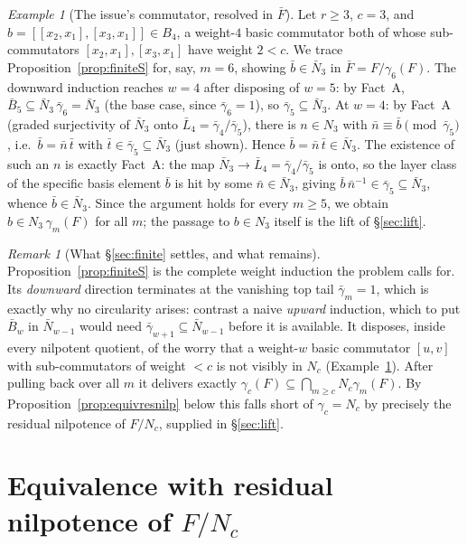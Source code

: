 \documentclass{amsart}
\theoremstyle{definition}
\theoremstyle{remark}
\newtheorem{remark}{Remark}
\newtheorem{example}{Example}
\begin{document}
\begin{example}[The issue's commutator, resolved in $\bar F$]\label{ex:worked}
Let $r\ge3$, $c=3$, and $b=[[x_2,x_1],[x_3,x_1]]\in B_4$, a weight-$4$ basic
commutator both of whose sub-commutators $[x_2,x_1],[x_3,x_1]$ have weight $2<c$. We
trace Proposition~\ref{prop:finiteS} for, say, $m=6$, showing $\bar b\in\bar N_3$ in
$\bar F=F/\gamma_6(F)$. The downward induction reaches $w=4$ after disposing of
$w=5$: by Fact~A, $\bar B_5\subseteq\bar N_3\,\bar\gamma_6=\bar N_3$ (the base case,
since $\bar\gamma_6=1$), so $\bar\gamma_5\subseteq\bar N_3$. At $w=4$: by Fact~A
(graded surjectivity of $\bar N_3$ onto $\bar L_4=\bar\gamma_4/\bar\gamma_5$), there
is $n\in N_3$ with $\bar n\equiv\bar b\pmod{\bar\gamma_5}$, i.e.\ $\bar b=\bar
n\,\bar t$ with $\bar t\in\bar\gamma_5\subseteq\bar N_3$ (just shown). Hence $\bar b=\bar n\,\bar t\in\bar N_3$. The existence of such an $n$
is exactly Fact~A: the map $\bar N_3\to\bar L_4=\bar\gamma_4/\bar\gamma_5$ is onto, so
the layer class of the specific basis element $\bar b$ is hit by some $\bar n\in\bar
N_3$, giving $\bar b\,\bar n^{-1}\in\bar\gamma_5\subseteq\bar N_3$, whence $\bar b\in
\bar N_3$. Since the argument holds for every $m\ge5$, we
obtain $b\in N_3\,\gamma_m(F)$ for all $m$; the passage to $b\in N_3$ itself is the
lift of \S\ref{sec:lift}.
\end{example}

\begin{remark}[What \S\ref{sec:finite} settles, and what remains]
\label{rem:finite-limit}
Proposition~\ref{prop:finiteS} is the complete weight induction the problem calls
for. Its \emph{downward} direction terminates at the vanishing top tail
$\bar\gamma_m=1$, which is exactly why no circularity arises: contrast a naive
\emph{upward} induction, which to put $\bar B_w$ in $\bar N_{w-1}$ would need
$\bar\gamma_{w+1}\subseteq\bar N_{w-1}$ before it is available. It disposes, inside
every nilpotent quotient, of the worry that a weight-$w$ basic commutator $[u,v]$ with
sub-commutators of weight $<c$ is not visibly in $N_c$
(Example~\ref{ex:worked}). After pulling back over all $m$ it delivers exactly
$\gamma_c(F)\subseteq\bigcap_{m\ge c}N_c\gamma_m(F)$. By
Proposition~\ref{prop:equivresnilp} below this falls short of $\gamma_c=N_c$ by
precisely the residual nilpotence of $F/N_c$, supplied in \S\ref{sec:lift}.
\end{remark}

\section{Equivalence with residual nilpotence of $F/N_c$}\label{sec:resnilp}
\end{document}
